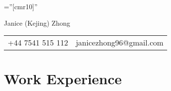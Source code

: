 \documentclass[a4paper,10pt]{article}
\begin{document}
\pagestyle{empty} %

\font\fb=''[cmr10]'' %

\par{\centering
        {\Huge Janice (Kejing) Zhong
    }\par}

\begin{center}
\begin{tabular}{l|l}
+44 7541 515 112 & janicezhong96@gmail.com
\end{tabular}
\end{center}

\section{Work Experience}
\noindent
\end{document}

